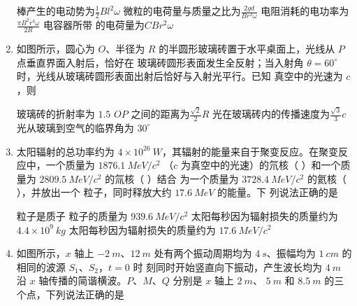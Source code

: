 \begin{enumerate}
\fourchoices
{棒产生的电动势为$\frac{1}{2} B l^{2} \omega$}
{微粒的电荷量与质量之比为$\frac{2 g d}{B r^{2} \omega}$}
{电阻消耗的电功率为$\frac{\pi B^{2} r^{4} \omega}{2 R}$}
{电容器所带 的电荷量为$C B r^{2} \omega$}


\item
如图所示，圆心为 $ O $、半径为 $ R $ 的半圆形玻璃砖置于水平桌面上，光线从 $ P $ 点垂直界面入射后，恰好在
玻璃砖圆形表面发生全反射；当入射角 $ \theta=60 ^{ \circ } $ 时，光线从玻璃砖圆形表面出射后恰好与入射光平行。已知
真空中的光速为 $ c $，则  
\begin{figure}[h!]
\centering

\end{figure}


\fourchoices
{玻璃砖的折射率为 $ 1.5 $}
{$ OP $ 之间的距离为$\frac{\sqrt{2}}{2} R$}
{光在玻璃砖内的传播速度为$\frac{\sqrt{3}}{3} c$}
{光从玻璃到空气的临界角为 $ 30 ^{ \circ } $}




\item
太阳辐射的总功率约为 $ 4 \times 10^{26} \ W $，其辐射的能量来自于聚变反应。在聚变反应中，一个质量为
$ 1876.1 \ MeV/c^{2} $ （$ c $ 为真空中的光速）的氘核（  ）和一个质量为 $ 2809.5 \ MeV/c^{2} $ 的氚核（  ）结合
为一个质量为 $ 3728.4 \ MeV/c^{2} $ 的氦核（  ），并放出一个  粒子，同时释放大约 $ 17.6 \ MeV $ 的能量。下
列说法正确的是  



\fourchoices
{ 粒子是质子}
{ 粒子的质量为 $ 939.6 \ MeV/c^{2} $}
{太阳每秒因为辐射损失的质量约为 $ 4.4 \times 10^9 \ kg $}
{太阳每秒因为辐射损失的质量约为 $ 17.6 \ MeV/c^{2} $}


\item
如图所示，$ x $ 轴上 $ -2 \ m $、$ 12 \ m $ 处有两个振动周期均为 $ 4 \ s $、振幅均为 $ 1 \ cm $ 的相同的波源 $ S_{1} $、$ S_{2} $，$ t=0 $ 时
刻同时开始竖直向下振动，产生波长均为 $ 4 \ m $ 沿 $ x $ 轴传播的简谐横波。$ P $、$ M $、$ Q $ 分别是 $ x $ 轴上 $ 2 \ m $、 $ 5 \ m $ 和
$ 8.5 \ m $ 的三个点，下列说法正确的是  
\begin{figure}[h!]
\centering

\end{figure}



\end{enumerate}
